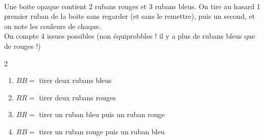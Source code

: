 \documentclass[main.tex]{subfiles}
\begin{document}
%	 
\newpage 
\begin{example} \hfill \\
Une boite opaque contient 2 rubans rouges et 3 rubans bleus.  On tire au hasard  1 premier ruban de la boite sans regarder (et sans le remettre), puis un second, et on note les couleurs de chaque. \\
On compte  4 issues possibles (non équiprobbles ! il y a plus de rubans bleus que de rouges !) 
\vspace{-0.5em}
\begin{multicols}{2}
\begin{enumerate}[label=\textbullet,leftmargin=* ] 
	\item $BB=$  \og tirer   deux rubans bleus\fg
	\item $RR=$   \og tirer   deux rubans rouges\fg
	\item $BR=$  \og tirer   un ruban bleu puis un ruban rouge \fg
	\item $RB=$   \og tirer   un ruban rouge puis un ruban bleu \fg
\end{enumerate}
\end{multicols}
\vspace{-0.5em} 
		\noindent\parbox[position=b]{0.38\linewidth}{
			\begin{tikzpicture}[xscale=1,yscale=1]
				

\end{tikzpicture}}
\end{example}
\end{document}

